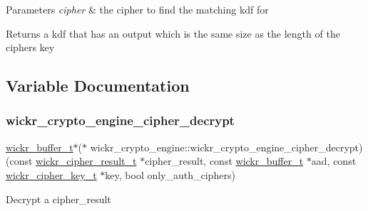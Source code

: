 \begin{DoxyParams}{Parameters}
{\em cipher} & the cipher to find the matching kdf for \\
\hline
\end{DoxyParams}
\begin{DoxyReturn}{Returns}
a kdf that has an output which is the same size as the length of the cipher\textquotesingle{}s key 
\end{DoxyReturn}


\subsection{Variable Documentation}
\mbox{\label{group__wickr__crypto__engine_ga459ef821cc40edb5e3c9ce1d571ddc00}} 
\subsubsection{\texorpdfstring{wickr\+\_\+crypto\+\_\+engine\+\_\+cipher\+\_\+decrypt}{wickr\_crypto\_engine\_cipher\_decrypt}}
{\footnotesize\ttfamily \hyperlink{structwickr__buffer}{wickr\+\_\+buffer\+\_\+t}$\ast$($\ast$ wickr\+\_\+crypto\+\_\+engine\+::wickr\+\_\+crypto\+\_\+engine\+\_\+cipher\+\_\+decrypt) (const \hyperlink{structwickr__cipher__result}{wickr\+\_\+cipher\+\_\+result\+\_\+t} $\ast$cipher\+\_\+result, const \hyperlink{structwickr__buffer}{wickr\+\_\+buffer\+\_\+t} $\ast$aad, const \hyperlink{structwickr__cipher__key}{wickr\+\_\+cipher\+\_\+key\+\_\+t} $\ast$key, bool only\+\_\+auth\+\_\+ciphers)}

Decrypt a cipher\+\_\+result


